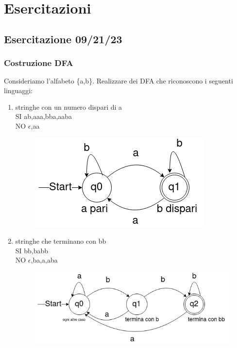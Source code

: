 \section{Esercitazioni} 
\subsection{Esercitazione 09/21/23}
\subsubsection{Costruzione DFA}
Consideriamo l'alfabeto \{a,b\}. 
Realizzare dei DFA che riconoscono i seguenti linguaggi:
\begin{enumerate}
  \item stringhe con un numero dispari di a 
\\ SI ab,aaa,bba,aaba
\\ NO $\epsilon$,aa

\begin{figure}[h]
  \includegraphics[scale = 0.5]{media/09_21_es1.png}
  \centering
\end{figure}

\item 
stringhe che terminano con bb
\\ SI bb,babb
\\ NO $\epsilon$,ba,a,aba

\begin{figure}[h]
  \includegraphics[scale = 0.5]{media/09_21_es2.png}
  \centering
\end{figure}


\end{enumerate}
